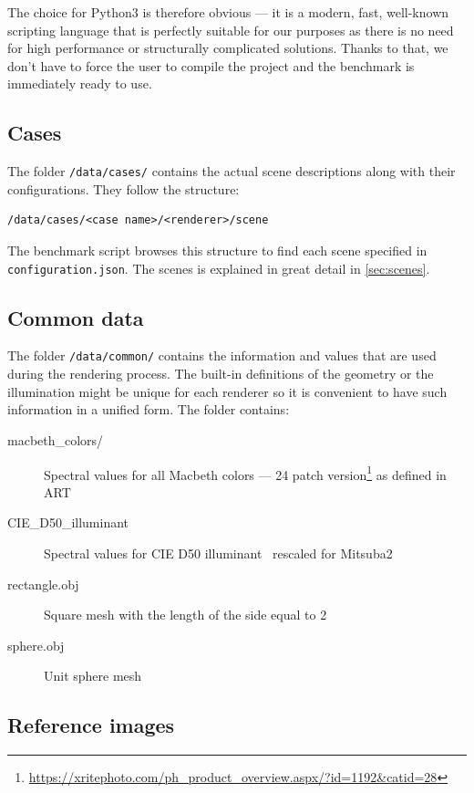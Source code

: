 The choice for Python3 is therefore obvious --- it is a modern, fast, well-known scripting language that is perfectly suitable for our purposes as there is no need for high performance or structurally complicated solutions. Thanks to that, we don't have to force the user to compile the project and the benchmark is immediately ready to use.

\subsection{Cases}

The folder \texttt{/data/cases/} contains the actual scene descriptions along with their configurations. They follow the structure:

\begin{lstlisting}
/data/cases/<case name>/<renderer>/scene
\end{lstlisting}

The benchmark script browses this structure to find each scene specified in \texttt{configuration.json}. The scenes is explained in great detail in \autoref{sec:scenes}.

\subsection{Common data}

The folder \texttt{/data/common/} contains the information and values that are used during the rendering process. The built-in definitions of the geometry or the illumination might be unique for each renderer so it is convenient to have such information in a unified form. The folder contains:

\begin{description}
	\item[macbeth\_colors/] Spectral values for all Macbeth colors --- 24 patch version\footnote{\url{https://xritephoto.com/ph_product_overview.aspx/?id=1192&catid=28}} as defined in ART
	\item[CIE\_D50\_illuminant] Spectral values for CIE D50 illuminant~\cite{cieData} rescaled for Mitsuba2
	\item[rectangle.obj] Square mesh with the length of the side equal to 2
	\item[sphere.obj] Unit sphere mesh
\end{description}

\subsection{Reference images}

